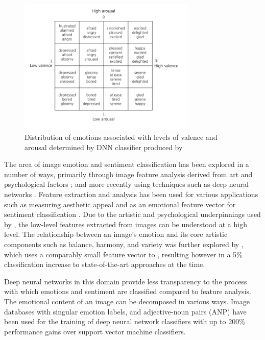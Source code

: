 \documentclass{article}
\begin{document}
\begin{figure}[h!]
	\includegraphics[width=0.75\textwidth]{images/valence-arousal-grid.png}
	\caption{Distribution of emotions associated with levels of valence and arousal determined by DNN classifier produced by \citet{kim2018building}}
	\label{fig:valence-arousal}
\end{figure}

The area of image emotion and sentiment classification has been explored in a number of ways, primarily through image feature analysis derived from art and psychological factors \citep{machajdik2010affective}; and more recently using techniques such as deep neural networks \citep{chen2015learning, kim2018building}.
Feature extraction and analysis has been used for various applications such as measuring aesthetic appeal \citep{den2010using,den2010comparing,den2011evolving} and as an emotional feature vector for sentiment classification \citep{machajdik2010affective}.
Due to the artistic and psychological underpinnings used by \citet{machajdik2010affective}, the low-level features extracted from images can be understood at a high level.
The relationship between an image's emotion and its core artistic components such as balance, harmony, and variety was further explored by \citet{zhao2014exploring}, which uses a comparably small feature vector to \citet{machajdik2010affective}, resulting however in a 5\% classification increase to state-of-the-art approaches at the time.

Deep neural networks in this domain provide less transparency to the process with which emotions and sentiment are classified compared to feature analysis.
The emotional content of an image can be decomposed in various ways.
Image databases with singular emotion labels, and adjective-noun pairs (ANP) have been used for the training of deep neural network classifiers \citep{chen2014deepsentibank, yang2018visual} with up to 200\% performance gains over support vector machine classifiers.
\end{document}
